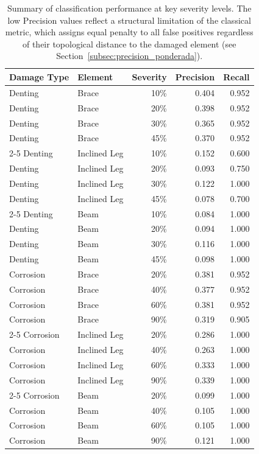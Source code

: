 \documentclass[preprint,12pt]{elsarticle}
\begin{document}
\begin{table}[!ht]
    \centering
    \caption{Summary of classification performance at key severity levels. The low Precision values reflect a structural limitation of the classical metric, which assigns equal penalty to all false positives regardless of their topological distance to the damaged element (see Section~\ref{subsec:precision_ponderada}).}
    \label{tab:metricas_compacta}
    \begin{tabular}{llrrr}
        \toprule
        Damage Type & Element & Severity & Precision & Recall \\
        \midrule
        Denting & Brace & 10\% & 0.404 & 0.952 \\
        Denting & Brace & 20\% & 0.398 & 0.952 \\
        Denting & Brace & 30\% & 0.365 & 0.952 \\
        Denting & Brace & 45\% & 0.370 & 0.952 \\
        \cmidrule{2-5}
        Denting & Inclined Leg & 10\% & 0.152 & 0.600 \\
        Denting & Inclined Leg & 20\% & 0.093 & 0.750 \\
        Denting & Inclined Leg & 30\% & 0.122 & 1.000 \\
        Denting & Inclined Leg & 45\% & 0.078 & 0.700 \\
        \cmidrule{2-5}
        Denting & Beam & 10\% & 0.084 & 1.000 \\
        Denting & Beam & 20\% & 0.094 & 1.000 \\
        Denting & Beam & 30\% & 0.116 & 1.000 \\
        Denting & Beam & 45\% & 0.098 & 1.000 \\
        \midrule
        Corrosion & Brace & 20\% & 0.381 & 0.952 \\
        Corrosion & Brace & 40\% & 0.377 & 0.952 \\
        Corrosion & Brace & 60\% & 0.381 & 0.952 \\
        Corrosion & Brace & 90\% & 0.319 & 0.905 \\
        \cmidrule{2-5}
        Corrosion & Inclined Leg & 20\% & 0.286 & 1.000 \\
        Corrosion & Inclined Leg & 40\% & 0.263 & 1.000 \\
        Corrosion & Inclined Leg & 60\% & 0.333 & 1.000 \\
        Corrosion & Inclined Leg & 90\% & 0.339 & 1.000 \\
        \cmidrule{2-5}
        Corrosion & Beam & 20\% & 0.099 & 1.000 \\
        Corrosion & Beam & 40\% & 0.105 & 1.000 \\
        Corrosion & Beam & 60\% & 0.105 & 1.000 \\
        Corrosion & Beam & 90\% & 0.121 & 1.000 \\
        \bottomrule
    \end{tabular}
\end{table}
\end{document}
